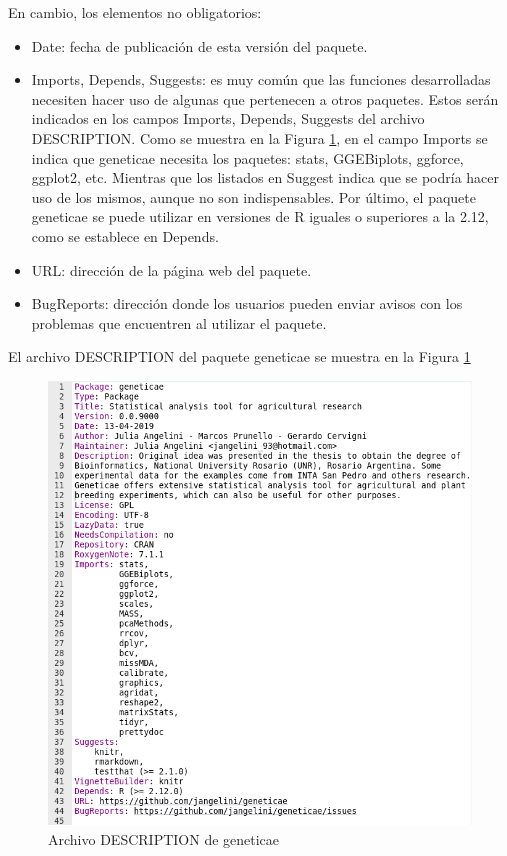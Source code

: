 En cambio, los elementos no obligatorios:
\begin{itemize}
\item Date: fecha de publicación de esta versión del paquete.
\item Imports, Depends, Suggests: es muy común que las funciones desarrolladas necesiten hacer uso de algunas que pertenecen a otros paquetes. Estos serán indicados en los campos Imports, Depends, Suggests del archivo DESCRIPTION. Como se muestra en la Figura \ref{fig:fig33}, en el campo Imports se indica que geneticae necesita los paquetes: stats, GGEBiplots, ggforce, ggplot2, etc. Mientras que los listados en Suggest indica que se podría hacer uso de los mismos, aunque no son indispensables. Por último, el paquete geneticae se puede utilizar en versiones de R iguales o superiores a la 2.12, como se establece en Depends.
\item URL: dirección de la página web del paquete.
\item BugReports: dirección donde los usuarios pueden enviar avisos con los problemas que encuentren al utilizar el paquete.
\end{itemize}

El archivo DESCRIPTION del paquete geneticae se muestra en la Figura \ref{fig:fig33}

 \begin{figure}[H]
	\begin{center}
		\includegraphics[width=13cm]{./Graficos/DESCRIPTION.png}	
	\end{center}
	\caption{Archivo DESCRIPTION de geneticae}
	\label{fig:fig33}
\end{figure}


